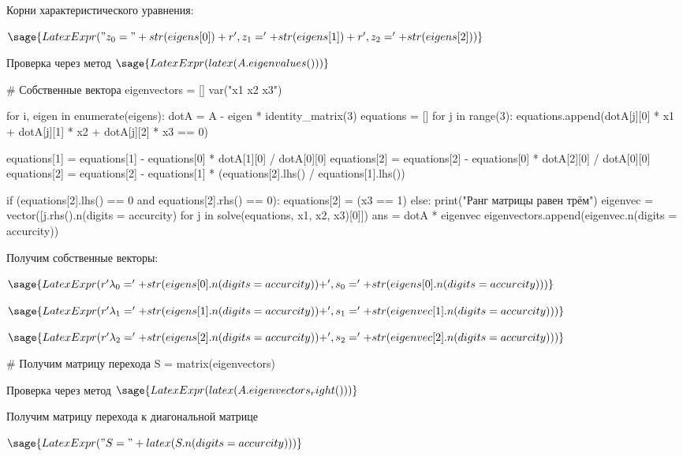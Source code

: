 \documentclass[14pt, a4paper]{article}
\begin{document}
Корни характеристического уравнения:

$\sage{LatexExpr("z_0 = " + str(eigens[0]) + r', z_1 = ' + str(eigens[1]) + r', z_2 = ' + str(eigens[2]))}$



Проверка через метод
$\sage{LatexExpr(latex(A.eigenvalues()))}$


\begin{sagesilent}
    # Собственные вектора
    eigenvectors = []
    var("x1 x2 x3")

    for i, eigen in enumerate(eigens):
        dotA = A - eigen * identity_matrix(3)    
        equations = []
        for j in range(3):
            equations.append(dotA[j][0] * x1 + dotA[j][1] * x2 + dotA[j][2] * x3 == 0)

        equations[1] = equations[1] - equations[0] * dotA[1][0] / dotA[0][0]
        equations[2] = equations[2] - equations[0] * dotA[2][0] / dotA[0][0]
        equations[2] = equations[2] - equations[1] * (equations[2].lhs() / equations[1].lhs())

        if (equations[2].lhs() == 0 and equations[2].rhs() == 0):
            equations[2] = (x3 == 1)
        else:
            print("Ранг матрицы равен трём")
        eigenvec = vector([j.rhs().n(digits = accurcity) for j in solve(equations, x1, x2, x3)[0]])
        ans = dotA * eigenvec
        eigenvectors.append(eigenvec.n(digits = accurcity))
\end{sagesilent}

Получим собственные векторы:

$\sage{LatexExpr(r'\lambda_0 = ' + str(eigens[0].n(digits = accurcity)) + ', s_0 = ' + str(eigens[0].n(digits = accurcity)))}$

$\sage{LatexExpr(r'\lambda_1 = ' + str(eigens[1].n(digits = accurcity)) + ', s_1 = ' + str(eigenvec[1].n(digits = accurcity)))}$

$\sage{LatexExpr(r'\lambda_2 = ' + str(eigens[2].n(digits = accurcity)) + ', s_2 = ' + str(eigenvec[2].n(digits = accurcity)))}$

\begin{sagesilent}
    # Получим матрицу перехода
    S = matrix(eigenvectors)
\end{sagesilent}


Проверка через метод
$\sage{LatexExpr(latex(A.eigenvectors_right()))}$

Получим матрицу перехода к диагональной матрице

$\sage{LatexExpr("S = " + latex(S.n(digits = accurcity)))}$
\end{document}
